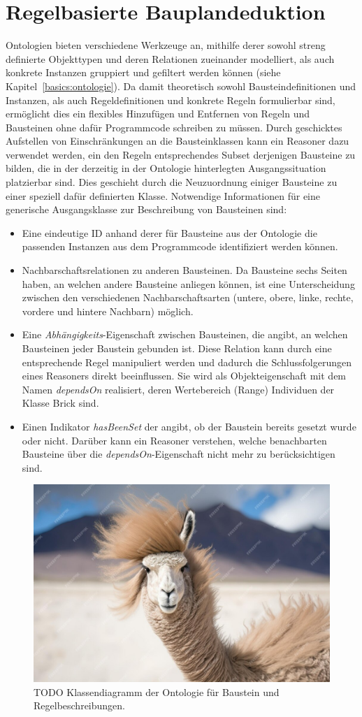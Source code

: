 \section{Regelbasierte Bauplandeduktion}\label{concept:regelbasierte_bauplandeduktion}
Ontologien bieten verschiedene Werkzeuge an, mithilfe derer sowohl streng definierte Objekttypen und deren Relationen zueinander modelliert, als auch konkrete Instanzen gruppiert und gefiltert werden können (siehe Kapitel~\ref{basics:ontologie}).
Da damit theoretisch sowohl Bausteindefinitionen und Instanzen, als auch Regeldefinitionen und konkrete Regeln formulierbar sind, ermöglicht dies ein flexibles Hinzufügen und Entfernen von Regeln und Bausteinen ohne dafür Programmcode schreiben zu müssen.
Durch geschicktes Aufstellen von Einschränkungen an die Bausteinklassen kann ein Reasoner dazu verwendet werden, ein den Regeln entsprechendes Subset derjenigen Bausteine zu bilden, die in der derzeitig in der Ontologie hinterlegten Ausgangssituation platzierbar sind.
Dies geschieht durch die Neuzuordnung einiger Bausteine zu einer speziell dafür definierten Klasse.
Notwendige Informationen für eine generische Ausgangsklasse zur Beschreibung von Bausteinen sind:
\begin{itemize}
  \item Eine eindeutige ID anhand derer für Bausteine aus der Ontologie die passenden Instanzen aus dem Programmcode identifiziert werden können.
  \item Nachbarschaftsrelationen zu anderen Bausteinen. 
  Da Bausteine sechs Seiten haben, an welchen andere Bausteine anliegen können, ist eine Unterscheidung zwischen den verschiedenen Nachbarschaftsarten (untere, obere, linke, rechte, vordere und hintere Nachbarn) möglich.
  \item Eine \textit{Abhängigkeits}-Eigenschaft zwischen Bausteinen, die angibt, an welchen Bausteinen jeder Baustein gebunden ist. 
  Diese Relation kann durch eine entsprechende Regel manipuliert werden und dadurch die Schlussfolgerungen eines Reasoners direkt beeinflussen. 
  Sie wird als Objekteigenschaft mit dem Namen \textit{dependsOn} realisiert, deren Wertebereich (Range) Individuen der Klasse Brick sind.
  \item Einen Indikator \textit{hasBeenSet} der angibt, ob der Baustein bereits gesetzt wurde oder nicht. 
  Darüber kann ein Reasoner verstehen, welche benachbarten Bausteine über die \textit{dependsOn}-Eigenschaft nicht mehr zu berücksichtigen sind.
\end{itemize}
\begin{figure}[htb]
  \centering
  \includegraphics[width=0.4\columnwidth]{fig/TODO.jpg}
  \caption{TODO Klassendiagramm der Ontologie für Baustein und Regelbeschreibungen.}\label{fig:concept:ontologie_diagramm}
\end{figure}
